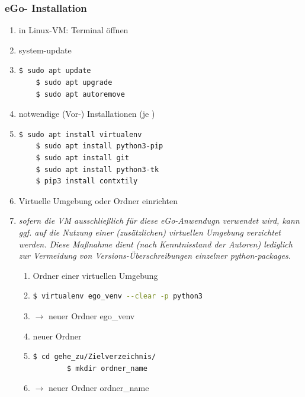 \documentclass[
a4paper,     %
12pt         %
]{scrartcl}  %
\begin{document}
\subsubsection{eGo- Installation}
\begin{enumerate}
	\item in Linux-VM: Terminal öffnen
	\item system-update %
	\item[] \begin{lstlisting}[language=bash]
	$ sudo apt update
	$ sudo apt upgrade
	$ sudo apt autoremove
	\end{lstlisting}
	\item notwendige (Vor-) Installationen (je )
	\item[] \begin{lstlisting}[language=bash]
	$ sudo apt install virtualenv
	$ sudo apt install python3-pip
	$ sudo apt install git
	$ sudo apt install python3-tk
	$ pip3 install contxtily
	\end{lstlisting}
	\item Virtuelle Umgebung oder Ordner einrichten
	\item[] \textit{sofern die VM ausschließlich für diese eGo-Anwendugn verwendet wird, kann ggf. auf die Nutzung einer (zusätzlichen) virtuellen Umgebung verzichtet werden. Diese Maßnahme dient (nach Kenntnisstand der Autoren) lediglich zur Vermeidung von Versions-Überschreibungen einzelner python-packages. }
	\begin{enumerate}
		\item Ordner einer virtuellen Umgebung

		\item[]
		\begin{lstlisting}[language=bash]
		$ virtualenv ego_venv --clear -p python3
		\end{lstlisting}
		\vspace{-0.8cm}
		\item[] $\rightarrow$ neuer Ordner \glqq ego\_venv \grqq

		\item neuer Ordner
		\item[]
		\begin{lstlisting}[language=bash]
		$ cd gehe_zu/Zielverzeichnis/
		$ mkdir ordner_name
		\end{lstlisting}
		\vspace{-0.8cm}
		\item[] $\rightarrow$ neuer Ordner \glqq ordner\_name \grqq
	\end{enumerate}



\end{enumerate}
\end{document}
